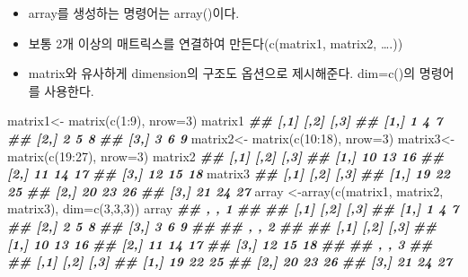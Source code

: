 \documentclass[
]{book}
\newenvironment{Shaded}{\begin{snugshade}}{\end{snugshade}}
\newcommand{\AttributeTok}[1]{\textcolor[rgb]{0.77,0.63,0.00}{#1}}
\newcommand{\DecValTok}[1]{\textcolor[rgb]{0.00,0.00,0.81}{#1}}
\newcommand{\DocumentationTok}[1]{\textcolor[rgb]{0.56,0.35,0.01}{\textbf{\textit{#1}}}}
\newcommand{\FunctionTok}[1]{\textcolor[rgb]{0.00,0.00,0.00}{#1}}
\newcommand{\NormalTok}[1]{#1}
\newcommand{\OtherTok}[1]{\textcolor[rgb]{0.56,0.35,0.01}{#1}}
\newcommand{\SpecialCharTok}[1]{\textcolor[rgb]{0.00,0.00,0.00}{#1}}
\providecommand{\tightlist}{%
  \setlength{\itemsep}{0pt}\setlength{\parskip}{0pt}}
\theoremstyle{definition}
\theoremstyle{definition}
\theoremstyle{definition}
\theoremstyle{definition}
\theoremstyle{remark}
\begin{document}
\begin{itemize}
\tightlist
\item
  array를 생성하는 명령어는 array()이다.
\item
  보통 2개 이상의 매트릭스를 연결하여 만든다(c(matrix1, matrix2, \ldots.))
\item
  matrix와 유사하게 dimension의 구조도 옵션으로 제시해준다. dim=c()의 명령어를 사용한다.
\end{itemize}

\begin{Shaded}
\begin{Highlighting}[]
\NormalTok{matrix1}\OtherTok{\textless{}{-}} \FunctionTok{matrix}\NormalTok{(}\FunctionTok{c}\NormalTok{(}\DecValTok{1}\SpecialCharTok{:}\DecValTok{9}\NormalTok{), }\AttributeTok{nrow=}\DecValTok{3}\NormalTok{)}
\NormalTok{matrix1}
\DocumentationTok{\#\#      [,1] [,2] [,3]}
\DocumentationTok{\#\# [1,]    1    4    7}
\DocumentationTok{\#\# [2,]    2    5    8}
\DocumentationTok{\#\# [3,]    3    6    9}
\NormalTok{matrix2}\OtherTok{\textless{}{-}} \FunctionTok{matrix}\NormalTok{(}\FunctionTok{c}\NormalTok{(}\DecValTok{10}\SpecialCharTok{:}\DecValTok{18}\NormalTok{), }\AttributeTok{nrow=}\DecValTok{3}\NormalTok{)}
\NormalTok{matrix3}\OtherTok{\textless{}{-}} \FunctionTok{matrix}\NormalTok{(}\FunctionTok{c}\NormalTok{(}\DecValTok{19}\SpecialCharTok{:}\DecValTok{27}\NormalTok{), }\AttributeTok{nrow=}\DecValTok{3}\NormalTok{)}
\NormalTok{matrix2}
\DocumentationTok{\#\#      [,1] [,2] [,3]}
\DocumentationTok{\#\# [1,]   10   13   16}
\DocumentationTok{\#\# [2,]   11   14   17}
\DocumentationTok{\#\# [3,]   12   15   18}
\NormalTok{matrix3}
\DocumentationTok{\#\#      [,1] [,2] [,3]}
\DocumentationTok{\#\# [1,]   19   22   25}
\DocumentationTok{\#\# [2,]   20   23   26}
\DocumentationTok{\#\# [3,]   21   24   27}
\NormalTok{array }\OtherTok{\textless{}{-}}\FunctionTok{array}\NormalTok{(}\FunctionTok{c}\NormalTok{(matrix1, matrix2, matrix3), }\AttributeTok{dim=}\FunctionTok{c}\NormalTok{(}\DecValTok{3}\NormalTok{,}\DecValTok{3}\NormalTok{,}\DecValTok{3}\NormalTok{))}
\NormalTok{array}
\DocumentationTok{\#\# , , 1}
\DocumentationTok{\#\# }
\DocumentationTok{\#\#      [,1] [,2] [,3]}
\DocumentationTok{\#\# [1,]    1    4    7}
\DocumentationTok{\#\# [2,]    2    5    8}
\DocumentationTok{\#\# [3,]    3    6    9}
\DocumentationTok{\#\# }
\DocumentationTok{\#\# , , 2}
\DocumentationTok{\#\# }
\DocumentationTok{\#\#      [,1] [,2] [,3]}
\DocumentationTok{\#\# [1,]   10   13   16}
\DocumentationTok{\#\# [2,]   11   14   17}
\DocumentationTok{\#\# [3,]   12   15   18}
\DocumentationTok{\#\# }
\DocumentationTok{\#\# , , 3}
\DocumentationTok{\#\# }
\DocumentationTok{\#\#      [,1] [,2] [,3]}
\DocumentationTok{\#\# [1,]   19   22   25}
\DocumentationTok{\#\# [2,]   20   23   26}
\DocumentationTok{\#\# [3,]   21   24   27}
\end{Highlighting}
\end{Shaded}
\end{document}
